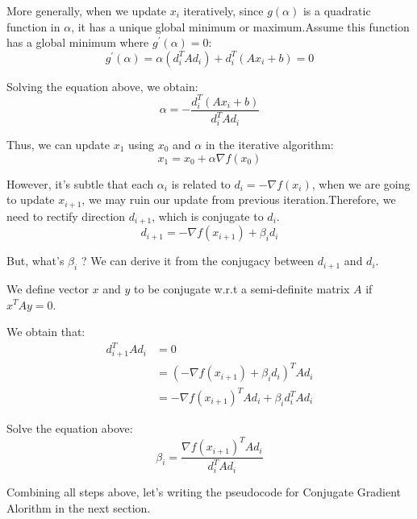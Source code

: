 \documentclass[titlepage,a4paper,12pt]{article}
\begin{document}
More generally, when we update $x_i$ iteratively, since $g(\alpha)$ is a quadratic function in $\alpha$, it has a unique global minimum or maximum.Assume this function has a global minimum where $g^{\prime}(\alpha) = 0$:
\begin{equation}
	g^{\prime}(\alpha) = \alpha (d_i^{T} A d_i) + d_i^{T} (A x_i + b) = 0
\end{equation}

Solving the equation above, we obtain:
\begin{equation}
	\alpha = - \frac{d_i^{T} (A x_i + b)}{d_i^{T} A d_i}
\end{equation}

Thus, we can update $x_1$ using $x_0$ and $\alpha$ in the iterative algorithm:
\begin{equation}
	x_{1} = x_0 + \alpha \nabla f(x_0)
\end{equation}

However, it's subtle that each $\alpha_i$ is related to $d_i = -\nabla f(x_i)$, when we are going to update $x_{i + 1}$, we may ruin our update from previous iteration.Therefore, we need to rectify direction $d_{i + 1}$, which is conjugate to $d_i$.
\begin{equation}
	d_{i + 1} = - \nabla f(x_{i + 1}) + \beta_i d_i
\end{equation}

But, what's $\beta_i$ ? We can derive it from the conjugacy between $d_{i + 1}$ and $d_i$.

We define vector $x$ and $y$ to be conjugate w.r.t a semi-definite matrix $A$ if $x^{T} A y = 0$.

We obtain that: 
\begin{equation}
\begin{aligned}
	d_{i + 1}^{T} A d_i &= 0 \\
						&= \left( - \nabla f(x_{i + 1}) + \beta_i d_i \right)^{T} A d_i \\
						&= -\nabla f(x_{i + 1})^{T} A d_i + \beta_i d_i^{T} A d_i
\end{aligned}
\end{equation}

Solve the equation above:
\begin{equation}
	\beta_i = \frac{\nabla f(x_{i + 1})^{T} A d_i}{d_i^{T} A d_i}
\end{equation}

Combining all steps above, let's writing the pseudocode for Conjugate Gradient Alorithm in the next section.
\end{document}
